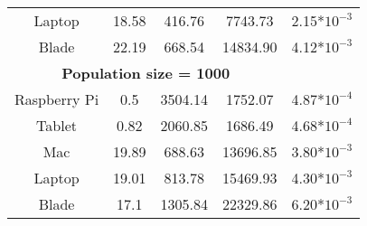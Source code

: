 \begin{small}
\begin{table}[!ht]
\begin{tabular}{ccccc}
Laptop & 18.58 & 416.76 & 7743.73&2.15*$10^{-3}$ \\
Blade & 22.19 & 668.54 & 14834.90&4.12*$10^{-3}$ \\ \hline
\multicolumn{4}{c}{\textbf{Population size = 1000}}\\ %
Raspberry Pi&0.5&3504.14& 1752.07&4.87*$10^{-4}$ \\
Tablet & 0.82 & 2060.85 & 1686.49&4.68*$10^{-4}$ \\
Mac &19.89 & 688.63 & 13696.85&3.80*$10^{-3}$ \\
Laptop &19.01&813.78& 15469.93&4.30*$10^{-3}$ \\
Blade &	17.1&1305.84& 22329.86&6.20*$10^{-3}$ \\ \hline

\end{tabular}
\end{table} 
\end{small}





